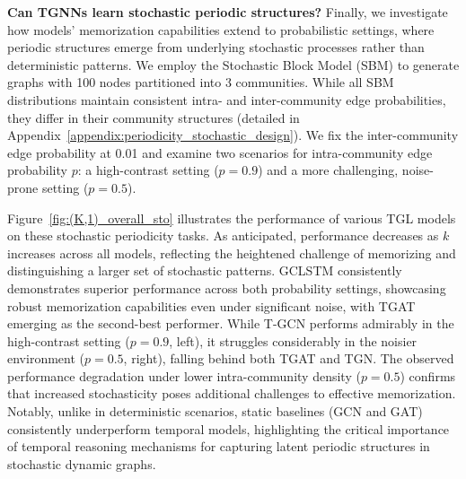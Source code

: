 


 \textbf{Can TGNNs learn stochastic periodic structures?} Finally, we investigate how models' memorization capabilities extend to probabilistic settings, where periodic structures emerge from underlying stochastic processes rather than deterministic patterns. 
We employ the Stochastic Block Model (SBM) to generate graphs with 100 nodes partitioned into 3 communities. While all SBM distributions maintain consistent intra- and inter-community edge probabilities, they differ in their community structures (detailed in Appendix~\ref{appendix:periodicity_stochastic_design}).
We fix the inter-community edge probability at 0.01 and examine two scenarios for intra-community edge probability $p$: a high-contrast setting ($p=0.9$) and a more challenging, noise-prone setting ($p=0.5$).

Figure~\ref{fig:(K,1)_overall_sto} illustrates the performance of various TGL models on these stochastic periodicity tasks. As anticipated, performance decreases as $k$ increases across all models, reflecting the heightened challenge of memorizing and distinguishing a larger set of stochastic patterns. GCLSTM consistently demonstrates superior performance across both probability settings, showcasing robust memorization capabilities even under significant noise, with TGAT emerging as the second-best performer. While T-GCN performs admirably in the high-contrast setting ($p=0.9$, left), it struggles considerably in the noisier environment ($p=0.5$, right), falling behind both TGAT and TGN. The observed performance degradation under lower intra-community density ($p=0.5$) confirms that increased stochasticity poses additional challenges to effective memorization. Notably, unlike in deterministic scenarios, static baselines (GCN and GAT) consistently underperform temporal models, highlighting the critical importance of temporal reasoning mechanisms for capturing latent periodic structures in stochastic dynamic graphs.

